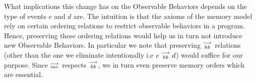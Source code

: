     What implications this change has on the Observable Behaviors depends on the type of events $e$ and $d$ are.
    The intuition is that the axioms of the memory model rely on certain ordering relations to restrict observable behaviors in a program.
    Hence, preserving these ordering relations would help us in turn not introduce new Observable Behaviors.
    In particular we note that preserving $\stackrel{\longrightarrow}{_{hb}}$ relations (other than the one we eliminate intentionally i.e $e\stackrel{\longrightarrow}{_{hb}}d$) would suffice for our purpose. 
    Since $\stackrel{\longrightarrow}{_{mo}}$ respects $\stackrel{\longrightarrow}{_{hb}}$, we in turn even preserve memory orders which are essential.  
    

